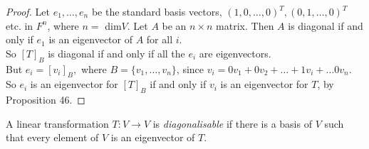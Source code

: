 \begin{proof}
Let $e_1,\dots,e_n$ be the standard basis vectors, $(1,0,\dots,0)^T, (0,1,\dots,0)^T$ etc. in $F^n$, where $n =$ dim$V$. Let $A$ be an $n \times n$ matrix. Then $A$ is diagonal  if and only if $e_1$ is an eigenvector of $A$ for all $i$.\\

 So $[T]_B$ is diagonal if and only if all the $e_i$ are eigenvectors.\\
 
 But $e_i = [v_i]_B,$ where $B= \{v_1,\dots,v_n\}$, since $v_i = 0v_1 + 0v_2 + \dots + 1v_i + \dots 0v_n$. So $e_i$ is an eigenvector for $[T]_B$ if and only if $v_i$ is an eigenvector for $T$, by Proposition 46. 
\end{proof}

\begin{definition} A linear transformation $T: V \to V$ is \emph{diagonalisable} if there is a basis of $V$ such that every element of $V$ is an eigenvector of $T$.\end{definition}\vspace*{10pt}


